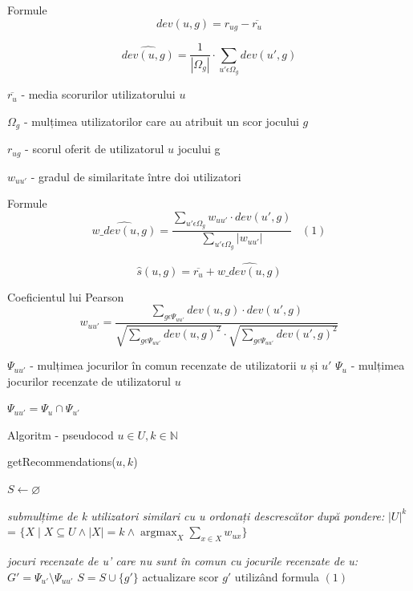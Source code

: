 \documentclass{beamer}
\DeclareMathOperator*{\argmax}{argmax}
\begin{document}
\begin{frame}{Formule}
    \[ dev(u,g) = r_{ug} - \overline{r_{u}} \]
    
    \[ \hat{dev(u,g)} = \frac{1}{|\Omega_{g}|} \cdot \sum\limits_{u' \epsilon \Omega_{g} } dev(u', g) \] 
    
    \( \overline{r_{u}}\) - media scorurilor utilizatorului \( u \)
    
    \( \Omega_{g}\) - mulțimea utilizatorilor care au atribuit un scor jocului \( g \)
    
    \( r_{ug} \) - scorul oferit de utilizatorul \( u \) jocului g
    
    \( w_{uu'}\) - gradul de similaritate între doi utilizatori
    
\end{frame}

\begin{frame}{Formule}
    \[ \hat{w\_dev(u,g)} = \dfrac{ \sum\limits_{u' \epsilon \Omega_{g} } w_{uu'} \cdot dev(u', g) }{\sum\limits_{u' \epsilon \Omega_{g}} |w_{uu'}|} \;\;\; (1) \]
    
    \[  \hat{s}(u,g) = \overline{r_u} + \hat{w\_dev(u,g)} \]
\end{frame}

\begin{frame}{Coeficientul lui Pearson}
\[ w_{uu'} = \dfrac{ \sum\limits_{g \epsilon \Psi_{uu'} } dev(u, g) \cdot dev(u', g) }{
\sqrt{\sum\limits_{g \epsilon \Psi_{uu'} } dev(u, g)^2} \cdot \sqrt{\sum\limits_{g \epsilon \Psi_{uu'} } dev(u', g)^2} }\]

\( \Psi_{uu'}\) - mulțimea jocurilor în comun recenzate de utilizatorii \( u \) și \( u' \)
\( \Psi_{u}\) - mulțimea jocurilor recenzate de utilizatorul \( u \)

\( \Psi_{uu'} = \Psi_{u} \cap \Psi_{u'} \) 

    
\end{frame}

\begin{frame}[fragile]{Algoritm - pseudocod}
    \( u \in U, k \in \mathbb{N} \)
    
    getRecommendations(\(u, k \))
    \begin{algorithmic}
\State $S \gets \varnothing $

\State \textit{ submulțime de k utilizatori similari cu u ordonați descrescător după pondere:}
\State \( |U|^k \) = \( \{ X  \; | \; X \subseteq U \land |X| = k \land \argmax_{X} \sum_{x \in X} w_{ux}  \} \)

    \State \textit{jocuri recenzate de u' care nu sunt în comun cu jocurile recenzate de u:}
    \State \( G' = \Psi_{u'} \setminus \Psi_{uu'}  \)
        \State \( S = S \cup \{ g' \}\)
        \State actualizare scor \( g' \) utilizând formula \( (1) \)

    \EndFor

\EndFor

\end{algorithmic}
\end{frame}
\end{document}

